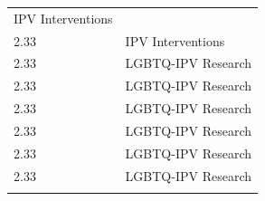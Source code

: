 \documentclass[]{tufte-handout}
\begin{document}
\begin{longtable}[]{@{}ll@{}}
\begin{minipage}[t]{0.26\columnwidth}
IPV Interventions\strut
\end{minipage}\tabularnewline
\begin{minipage}[t]{0.09\columnwidth}\raggedright\strut
2.33\strut
\end{minipage} & \begin{minipage}[t]{0.26\columnwidth}\raggedright\strut
IPV Interventions\strut
\end{minipage}\tabularnewline
\begin{minipage}[t]{0.09\columnwidth}\raggedright\strut
2.33\strut
\end{minipage} & \begin{minipage}[t]{0.26\columnwidth}\raggedright\strut
LGBTQ-IPV Research\strut
\end{minipage}\tabularnewline
\begin{minipage}[t]{0.09\columnwidth}\raggedright\strut
2.33\strut
\end{minipage} & \begin{minipage}[t]{0.26\columnwidth}\raggedright\strut
LGBTQ-IPV Research\strut
\end{minipage}\tabularnewline
\begin{minipage}[t]{0.09\columnwidth}\raggedright\strut
2.33\strut
\end{minipage} & \begin{minipage}[t]{0.26\columnwidth}\raggedright\strut
LGBTQ-IPV Research\strut
\end{minipage}\tabularnewline
\begin{minipage}[t]{0.09\columnwidth}\raggedright\strut
2.33\strut
\end{minipage} & \begin{minipage}[t]{0.26\columnwidth}\raggedright\strut
LGBTQ-IPV Research\strut
\end{minipage}\tabularnewline
\begin{minipage}[t]{0.09\columnwidth}\raggedright\strut
2.33\strut
\end{minipage} & \begin{minipage}[t]{0.26\columnwidth}\raggedright\strut
LGBTQ-IPV Research\strut
\end{minipage}\tabularnewline
\begin{minipage}[t]{0.09\columnwidth}\raggedright\strut
2.33\strut
\end{minipage} & \begin{minipage}[t]{0.26\columnwidth}\raggedright\strut
LGBTQ-IPV Research\strut
\end{minipage}\tabularnewline
\begin{minipage}[t]{0.09\columnwidth}\raggedright\strut

\end{minipage}
\end{longtable}
\end{document}
